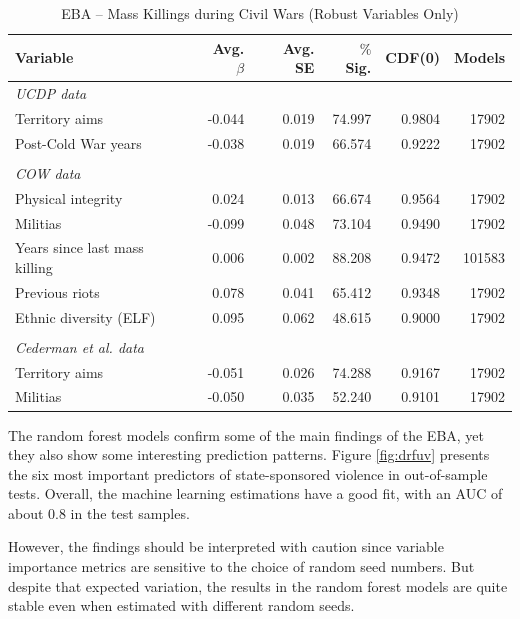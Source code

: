 \vspace{1cm}

\begin{table}[H]
\centering
\begin{tabular}{lrrrrr}
\hline
\textbf{Variable} & \textbf{Avg. $\beta$} & \textbf{Avg. SE} & \textbf{$\%$ Sig.} & \textbf{CDF(0)} & \textbf{Models} \\ \hline
\textit{UCDP data} &  &  &  &  &  \\
Territory aims & -0.044 & 0.019 & 74.997 & 0.9804 & 17902 \\
Post-Cold War years & -0.038 & 0.019 & 66.574 & 0.9222 & 17902 \\
 &  &  &  &  &  \\
\textit{COW data} &  &  &  &  &  \\
Physical integrity & 0.024 & 0.013 & 66.674 & 0.9564 & 17902 \\
Militias & -0.099 & 0.048 & 73.104 & 0.9490 & 17902 \\
Years since last mass killing & 0.006 & 0.002 & 88.208 & 0.9472 & 101583 \\
Previous riots & 0.078 & 0.041 & 65.412 & 0.9348 & 17902 \\
Ethnic diversity (ELF) & 0.095 & 0.062 & 48.615 & 0.9000 & 17902 \\
 &  &  &  &  &  \\
\textit{Cederman et al. data} &  &  &  &  &  \\
Territory aims & -0.051 & 0.026 & 74.288 & 0.9167 & 17902 \\
Militias & -0.050 & 0.035 & 52.240 & 0.9101 & 17902 \\ \hline
\end{tabular}
\caption{EBA -- Mass Killings during Civil Wars (Robust Variables Only)}
\label{tab:ucdp}
\end{table}

The random forest models confirm some of the main findings of the EBA, yet they also show some interesting prediction patterns. Figure \ref{fig:drfuv} presents the six most important predictors of state-sponsored violence in out-of-sample tests. Overall, the machine learning estimations have a good fit, with an AUC of about 0.8 in the test samples.

However, the findings should be interpreted with caution since variable importance metrics are sensitive to the choice of random seed numbers. But despite that expected variation, the results in the random forest models are quite stable even when estimated with different random seeds. 

